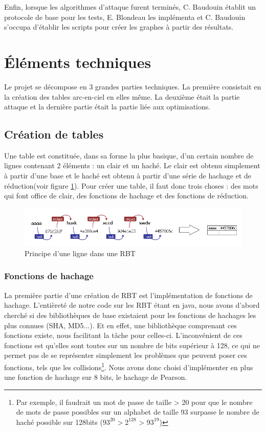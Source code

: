 \documentclass[french,12pt]{article}
\begin{document}
    Enfin, lorsque les algorithmes d'attaque furent terminés, C. Baudouin établit un protocole de base pour les tests, E. Blondeau les implémenta et C. Baudouin s'occupa d'établir les scripts pour créer les graphes à partir des résultats.

\section{Éléments techniques}
Le projet se décompose en 3 grandes parties techniques. La première consistait en la création des tables arc-en-ciel en elles même. La deuxième était la partie attaque et la dernière partie était la partie liée aux optimisations. 
        \subsection{Création de tables}\label{section:creationRBT}
         Une table est constituée, dans sa forme la plus basique, d'un certain nombre de lignes contenant 2 éléments : un clair et un haché. Le clair est obtenu simplement à partir d'une base et le haché est obtenu à partir d'une série de hachage et de réduction(voir figure \ref{fig:rbtprincipe}). Pour créer une table, il faut donc trois choses : des mots qui font office de clair, des fonctions de hachage et des fonctions de réduction. 
         
         \begin{figure}[hbt!]
             \centering
             \includegraphics[scale=0.8,frame]{img/rbtprincipe.png}
             \caption{Principe d'une ligne dans une RBT}
             \label{fig:rbtprincipe}
         \end{figure}
         
         \subsubsection{Fonctions de hachage}
         La première partie d'une création de RBT est l'implémentation de fonctions de hachage\cite{WikiHachage}. L'entièreté de notre code sur les RBT étant en java, nous avons d'abord cherché si des bibliothèques de base existaient pour les fonctions de hachages les plus connues (SHA, MD5...). Et en effet, une bibliothèque comprenant ces fonctions existe, nous facilitant la tâche pour celles-ci.
         \newline
         \indent L'inconvénient de ces fonctions est qu'elles sont toutes sur un nombre de bits supérieur à 128, ce qui ne permet pas de se représenter simplement les problèmes que peuvent poser ces fonctions, tels que les collisions\footnote{Par exemple, il faudrait un mot de passe de taille > 20 pour que le nombre de mots de passe possibles sur un alphabet de taille 93 surpasse le nombre de haché possible sur 128bits ($93^{20} > 2^{128}$ > $93^{19}$)}.
         Nous avons donc choisi d'implémenter en plus une fonction de hachage sur 8 bits, le hachage de Pearson\cite{WikiPearson}.
         
\end{document}
